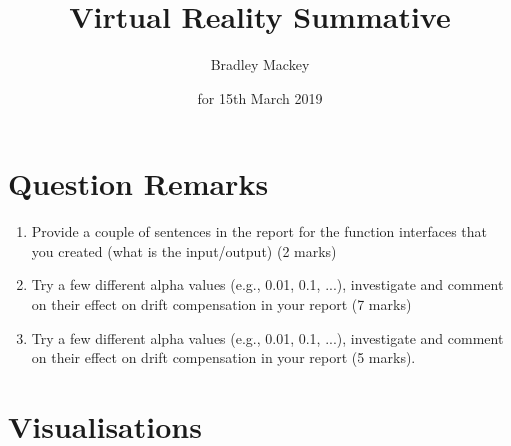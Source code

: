 \documentclass[11pt]{article}
\makeatletter
\newcommand{\skipitems}[1]{%
  \addtocounter{\@enumctr}{#1}%
}
\makeatother
\begin{document}
\title{\textbf{Virtual Reality Summative}}
\date{for 15th March 2019}
\author{Bradley Mackey}
\maketitle


\section*{Question Remarks}

\begin{enumerate}
\item Provide a couple of sentences in the report for the function interfaces that you created (what is the input/output) (2 marks)
\skipitems{1} %
\item Try a few different alpha values (e.g., 0.01, 0.1, ...), investigate and comment on their effect on drift compensation in your report (7 marks)
\item Try a few different alpha values (e.g., 0.01, 0.1, ...), investigate and comment on their effect on drift compensation in your report (5 marks).
\end{enumerate}

\section*{Visualisations}
\end{document}
